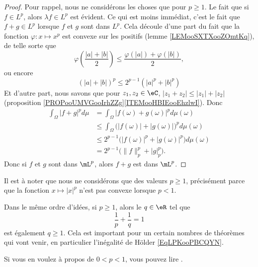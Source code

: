 \begin{proof}
	Pour rappel, nous ne considérons les choses que pour \( p\geq 1\). Le fait que si \( f\in L^p\), alors \( \lambda f\in L^p\) est évident. Ce qui est moins immédiat, c'est le fait que \( f+g\in L^p\) lorsque \( f\) et \( g\) sont dans \( L^p\). Cela découle d'une part du fait que la fonction \( \varphi\colon x\mapsto x^p\) est convexe sur les positifs (lemme \ref{LEMooSXTXooZOmtKq}), de telle sorte que
	\begin{equation}
		\varphi\left( \frac{ |a|+|b| }{2} \right)\leq\frac{ \varphi(|a|)+\varphi(|b|) }{2},
	\end{equation}
	ou encore
	\begin{equation}    \label{EqZFSduFa}
		(|a|+|b|)^p\leq 2^{p-1}(|a|^p+|b|^p)
	\end{equation}
	Et d'autre part, nous savons que pour \( z_1,z_2\in \eC\), \( | z_1+z_2 |\leq | z_1 |+| z_2 |\) (proposition \ref{PROPooUMVGooIrhZZg}\ref{ITEMooHBIEooEhzlwI}). Donc
	\begin{subequations}        \label{EQooKRMEooSLHUUc}
		\begin{align}
			\int_{\Omega}| f+g |^pd\mu & =\int_{\Omega}| f(\omega)+g(\omega) |^pd\mu(\omega)                     \\
			                           & \leq \int_{\Omega}\big( | f(\omega) |+| g(\omega) | \big)^pd\mu(\omega) \\
			                           & \leq 2^{p-1}\big( | f(\omega) |^p+| g(\omega) |^p \big)d\mu(\omega)     \\
			                           & =2^{p-1}\big( \| f \|_p^p+| g |_p^p \big).
		\end{align}
	\end{subequations}
	Donc si \( f\) et \( g\) sont dans \( \mL^p\), alors \( f+g\) est dans \( \mL^p\).
\end{proof}

\begin{normaltext}
	Il est à noter que nous ne considérons que des valeurs \( p\geq 1\), précisément parce que la fonction \( x\mapsto | x |^p\) n'est pas convexe lorsque \( p<1\).

	Dans le même ordre d'idées, si \( p\geq 1\), alors le \( q\in \eR\) tel que
	\begin{equation}
		\frac{1}{ p }+\frac{1}{ q }=1
	\end{equation}
	est également \( q\geq 1\). Cela est important pour un certain nombres de théorèmes qui vont venir, en particulier l'inégalité de Hölder \eqref{EqLPKooPBCQYN}.

	Si vous en voulez à propos de \( 0<p<1\), vous pouvez lire \cite{ooECQXooZUqbSO}.
\end{normaltext}

